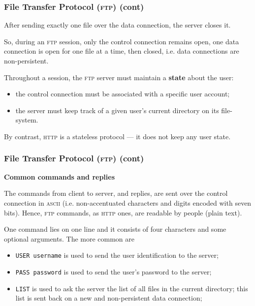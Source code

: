 %
\begin{frame}
\frametitle{File Transfer Protocol (\textsc{ftp}) (cont)}

After sending exactly one file over the data connection, the server
closes it.

So, during an \textsc{ftp} session, only the control connection
remains open, one data connection is open for one file at a time, then
closed, i.e. data connections are non-persistent.

Throughout a session, the \textsc{ftp} server must maintain a
\textbf{state} about the user:
\begin{itemize}

  \item the control connection must be associated with a specific
  user account;

  \item the server must keep track of a given user's current
  directory on its file-system.

\end{itemize}
By contrast, \textsc{http} is a stateless protocol --- it does not
keep any user state.

\end{frame}

%
\begin{frame}[containsverbatim]
\frametitle{File Transfer Protocol (\textsc{ftp}) (cont)}

\textbf{Common commands and replies}

The commands from client to server, and replies, are sent over the
control connection in \textsc{ascii} (i.e. non-accentuated characters
and digits encoded with seven bits). Hence, \textsc{ftp} commands, as
\textsc{http} ones, are readable by people (plain text).

One command lies on one line and it consists of four characters and
some optional arguments. The more common are
\begin{itemize}

  \item \verb+USER username+ is used to send the user identification
  to the server;

  \item \verb+PASS password+ is used to send the user's password to the
  server;

  \item \verb+LIST+ is used to ask the server the list of all files
  in the current directory; this list is sent back on a new and
  non-persistent data connection;

\end{itemize}

\end{frame}

